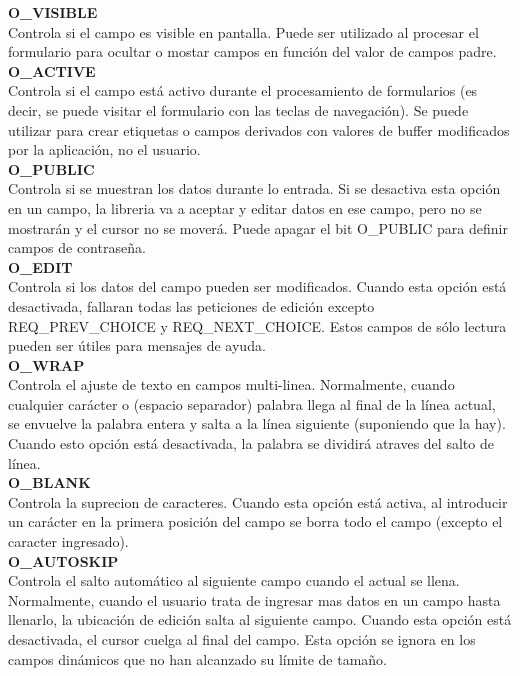 \documentclass{article}
\begin{document}
\textbf{O\_VISIBLE}\\
Controla si el campo es visible en pantalla. Puede ser utilizado al procesar el
formulario para ocultar o mostar campos en función del valor de campos padre.\\

\textbf{O\_ACTIVE}\\
Controla si el campo está activo durante el procesamiento de formularios (es
decir, se puede visitar el formulario con las teclas de navegación). Se puede
utilizar para crear etiquetas o campos derivados con valores de buffer
modificados por la aplicación, no el usuario.\\

\textbf{O\_PUBLIC}\\
Controla si se muestran los datos durante lo entrada. Si se desactiva esta
opción en un campo, la libreria va a aceptar y editar datos en ese campo, pero
no se mostrarán y el cursor no se moverá. Puede apagar el bit O\_PUBLIC para
definir campos de contraseña.\\

\textbf{O\_EDIT}\\
Controla si los datos del campo pueden ser modificados. Cuando esta opción está
desactivada, fallaran todas las peticiones de edición excepto REQ\_PREV\_CHOICE y
REQ\_NEXT\_CHOICE. Estos campos de sólo lectura pueden ser útiles para mensajes
de ayuda.\\

\textbf{O\_WRAP}\\
Controla el ajuste de texto en campos multi-linea. Normalmente, cuando
cualquier carácter o (espacio separador) palabra llega al final de la línea
actual, se envuelve la palabra entera y salta a la línea siguiente (suponiendo
que la hay). Cuando esto opción está desactivada, la palabra se dividirá
atraves del salto de línea.\\

\textbf{O\_BLANK}\\
Controla la suprecion de caracteres. Cuando esta opción está activa, al
introducir un carácter en la primera posición del campo se borra todo el campo
(excepto el caracter ingresado).\\

\textbf{O\_AUTOSKIP}\\
Controla el salto automático al siguiente campo cuando el actual se llena.
Normalmente, cuando el usuario trata de ingresar mas datos en un campo hasta
llenarlo, la ubicación de edición salta al siguiente campo. Cuando esta opción
está desactivada, el cursor cuelga al final del campo. Esta opción se ignora en
los campos dinámicos que no han alcanzado su límite de tamaño.\\
\end{document}
